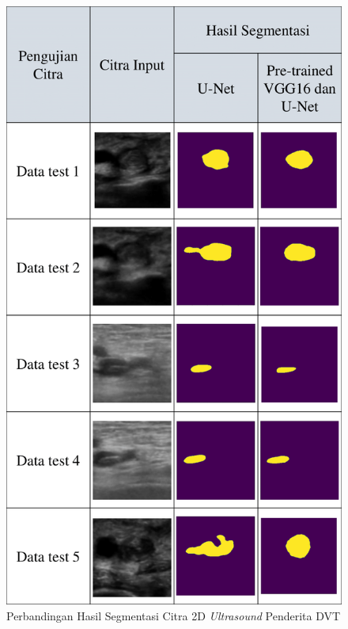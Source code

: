 \begin{figure}[htbp]
	\centering
	\includegraphics[scale= 0.4]{bab4/Predict_dvt/Predict_dvt-1.png}
	\caption{Perbandingan Hasil Segmentasi Citra 2D \textit{Ultrasound} Penderita DVT}
	\label{fig:result-label-tabel}
\end{figure}

